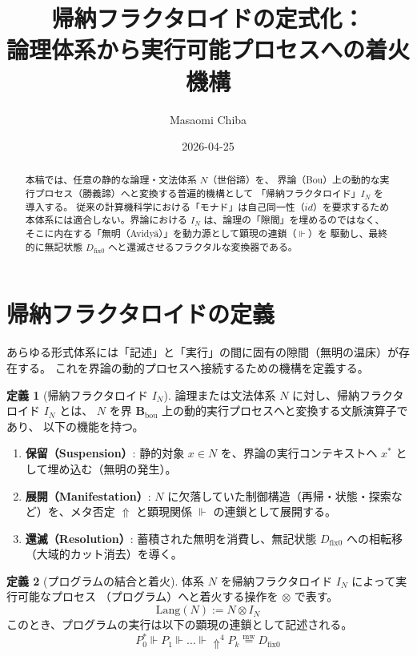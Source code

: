 \documentclass[11pt,a4paper]{article}
\theoremstyle{definition}
\newtheorem{definition}{定義}[section]
\newcommand{\dfix}{D_{\mathrm{fix}0}} %
\newcommand{\mweq}{\mathrel{\overset{\mathrm{mw}}{=}}}
\newcommand{\metanegation}{\Uparrow}
\newcommand{\susp}[1]{#1^*}
\newcommand{\aletheiai}{\Vdash} %
\newcommand{\Bou}{\mathbf{B}_{\mathrm{bou}}}  %
\begin{document}
\title{帰納フラクタロイドの定式化：\\
論理体系から実行可能プロセスへの着火機構}
\author{Masaomi Chiba}
\date{2026-04-25}
\maketitle

\begin{abstract}
本稿では、任意の静的な論理・文法体系 $N$（世俗諦）を、
界論（Bou）上の動的な実行プロセス（勝義諦）へと変換する普遍的機構として
「帰納フラクタロイド」$I_N$ を導入する。
従来の計算機科学における「モナド」は自己同一性（$id$）を要求するため
本体系には適合しない。界論における $I_N$ は、論理の「隙間」を埋めるのではなく、
そこに内在する「無明（Avidy\=a）」を動力源として顕現の連鎖（$\aletheiai$）を
駆動し、最終的に無記状態 $\dfix$ へと還滅させるフラクタルな変換器である。
\end{abstract}

\section{帰納フラクタロイドの定義}

あらゆる形式体系には「記述」と「実行」の間に固有の隙間（無明の温床）が存在する。
これを界論の動的プロセスへ接続するための機構を定義する。

\begin{definition}[帰納フラクタロイド $I_N$]
論理または文法体系 $N$ に対し、帰納フラクタロイド $I_N$ とは、
$N$ を界 $\Bou$ 上の動的実行プロセスへと変換する文脈演算子であり、
以下の機能を持つ。
\begin{enumerate}
    \item \textbf{保留（Suspension）}: 静的対象 $x \in N$ を、界論の実行コンテキストへ $\susp{x}$ として埋め込む（無明の発生）。
    \item \textbf{展開（Manifestation）}: $N$ に欠落していた制御構造（再帰・状態・探索など）を、メタ否定 $\metanegation$ と顕現関係 $\aletheiai$ の連鎖として展開する。
    \item \textbf{還滅（Resolution）}: 蓄積された無明を消費し、無記状態 $\dfix$ への相転移（大域的カット消去）を導く。
\end{enumerate}
\end{definition}

\begin{definition}[プログラムの結合と着火]
体系 $N$ を帰納フラクタロイド $I_N$ によって実行可能なプロセス
（プログラム）へと着火する操作を $\otimes$ で表す。
$$ \text{Lang}(N) := N \otimes I_N $$
このとき、プログラムの実行は以下の顕現の連鎖として記述される。
$$ \susp{P_0} \aletheiai P_1 \aletheiai \dots \aletheiai \metanegation^4 P_k \mweq \dfix $$
\end{definition}
\end{document}
